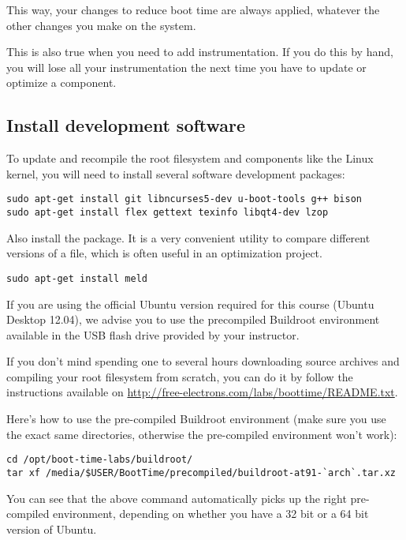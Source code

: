 This way, your changes to reduce boot time are always applied,
whatever the other changes you make on the system.

This is also true when you need to add instrumentation. If you do
this by hand, you will lose all your instrumentation the next
time you have to update or optimize a component.

\subsection{Install development software}

To update and recompile the root filesystem and
components like the Linux kernel, you will need to install several
software development packages:

\begin{verbatim}
sudo apt-get install git libncurses5-dev u-boot-tools g++ bison
sudo apt-get install flex gettext texinfo libqt4-dev lzop
\end{verbatim}



Also install the  package. It is a very
convenient utility to compare different versions of a file, which
is often useful in an optimization project.

\begin{verbatim}
sudo apt-get install meld
\end{verbatim}

If you are using the official Ubuntu version required for this course
(Ubuntu Desktop 12.04), we advise you to use the precompiled
Buildroot environment available in the USB flash drive provided by your
instructor.

If you don't mind spending one to several hours
downloading source archives and compiling your root filesystem from
scratch, you can do it by follow the instructions available on
\url{http://free-electrons.com/labs/boottime/README.txt}.

Here's how to use the pre-compiled Buildroot environment (make sure you
use the exact same directories, otherwise the pre-compiled environment
won't work):

\begin{verbatim}
cd /opt/boot-time-labs/buildroot/
tar xf /media/$USER/BootTime/precompiled/buildroot-at91-`arch`.tar.xz
\end{verbatim}

You can see that the above command automatically picks up the right
pre-compiled environment, depending on whether you have a 32 bit or
a 64 bit version of Ubuntu.

